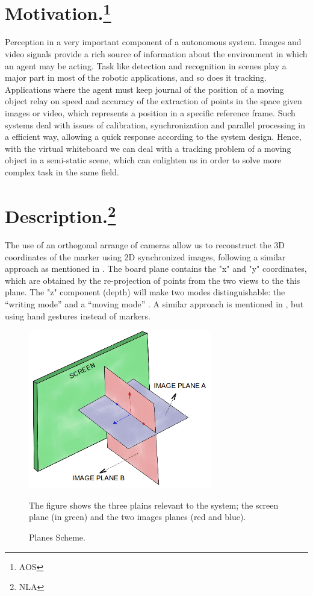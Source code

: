 \documentclass[a4paper,12pt]{article}
\begin{document}
\section[Motivation.]{Motivation.\footnote{AOS}}
Perception in a very important component of a autonomous system. Images and video signals provide a rich source of information about the environment in which an agent may be acting. Task like detection and recognition in scenes play a major part in most of the robotic applications, and so does it tracking. Applications where the agent must keep journal of the position of a moving object relay on speed and accuracy of the extraction of points in the space given images or video, which represents a position in a specific reference frame. Such systems deal with issues of calibration, synchronization and parallel processing in a efficient way, allowing a quick response according to the system design. Hence, with the virtual whiteboard we can deal with a tracking problem of a moving object in a semi-static scene, which can enlighten us in order to solve more complex task in the same field.
\section[Description.]{Description.\footnote{NLA}}
The use of an orthogonal arrange of cameras allow us to reconstruct the 3D coordinates of the marker using 2D synchronized images, following a similar approach as mentioned in \cite{laganiere}. The board plane contains the "x" and "y" coordinates, which are obtained by the re-projection of points from the two views to the this plane. The "z" component (depth) will make two modes distinguishable: the “writing mode” and a “moving mode” . A similar approach is mentioned in \cite{zabulis}, but using hand gestures instead of markers.

\begin{figure}[H]
    \begin{center}
    \includegraphics[width=8cm]{planesScheme.png}
    \caption{Planes Scheme.}
    The figure shows the three plains relevant to the system; the screen plane (in green) and  the two images planes (red and blue).
	\label{fig:planes}
    \end{center}
\end{figure}
\end{document}
